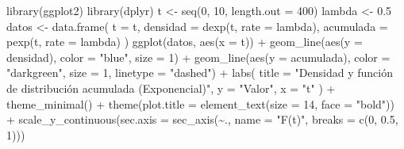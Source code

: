 \documentclass[
  letterpaper,
  ignorenonframetext,
  DIV=11,
  numbers=noendperiod]{scrartcl}
\newenvironment{Shaded}{\begin{snugshade}}{\end{snugshade}}
\newcommand{\AttributeTok}[1]{\textcolor[rgb]{0.40,0.45,0.13}{#1}}
\newcommand{\DecValTok}[1]{\textcolor[rgb]{0.68,0.00,0.00}{#1}}
\newcommand{\FloatTok}[1]{\textcolor[rgb]{0.68,0.00,0.00}{#1}}
\newcommand{\FunctionTok}[1]{\textcolor[rgb]{0.28,0.35,0.67}{#1}}
\newcommand{\NormalTok}[1]{\textcolor[rgb]{0.00,0.23,0.31}{#1}}
\newcommand{\OtherTok}[1]{\textcolor[rgb]{0.00,0.23,0.31}{#1}}
\newcommand{\SpecialCharTok}[1]{\textcolor[rgb]{0.37,0.37,0.37}{#1}}
\newcommand{\StringTok}[1]{\textcolor[rgb]{0.13,0.47,0.30}{#1}}
\begin{document}
\begin{Shaded}
\begin{Highlighting}[]
\FunctionTok{library}\NormalTok{(ggplot2)}
\FunctionTok{library}\NormalTok{(dplyr)}
\NormalTok{t }\OtherTok{\textless{}{-}} \FunctionTok{seq}\NormalTok{(}\DecValTok{0}\NormalTok{, }\DecValTok{10}\NormalTok{, }\AttributeTok{length.out =} \DecValTok{400}\NormalTok{)}
\NormalTok{lambda }\OtherTok{\textless{}{-}} \FloatTok{0.5}
\NormalTok{datos }\OtherTok{\textless{}{-}} \FunctionTok{data.frame}\NormalTok{(}
  \AttributeTok{t =}\NormalTok{ t,}
  \AttributeTok{densidad =} \FunctionTok{dexp}\NormalTok{(t, }\AttributeTok{rate =}\NormalTok{ lambda),}
  \AttributeTok{acumulada =} \FunctionTok{pexp}\NormalTok{(t, }\AttributeTok{rate =}\NormalTok{ lambda)}
\NormalTok{)}
\FunctionTok{ggplot}\NormalTok{(datos, }\FunctionTok{aes}\NormalTok{(}\AttributeTok{x =}\NormalTok{ t)) }\SpecialCharTok{+}
  \FunctionTok{geom\_line}\NormalTok{(}\FunctionTok{aes}\NormalTok{(}\AttributeTok{y =}\NormalTok{ densidad), }\AttributeTok{color =} \StringTok{"blue"}\NormalTok{, }\AttributeTok{size =} \DecValTok{1}\NormalTok{) }\SpecialCharTok{+}
  \FunctionTok{geom\_line}\NormalTok{(}\FunctionTok{aes}\NormalTok{(}\AttributeTok{y =}\NormalTok{ acumulada), }\AttributeTok{color =} \StringTok{"darkgreen"}\NormalTok{, }\AttributeTok{size =} \DecValTok{1}\NormalTok{, }\AttributeTok{linetype =} \StringTok{"dashed"}\NormalTok{) }\SpecialCharTok{+}
  \FunctionTok{labs}\NormalTok{(}
    \AttributeTok{title =} \StringTok{"Densidad y función de distribución acumulada (Exponencial)"}\NormalTok{,}
    \AttributeTok{y =} \StringTok{"Valor"}\NormalTok{,}
    \AttributeTok{x =} \StringTok{"t"}
\NormalTok{  ) }\SpecialCharTok{+}
  \FunctionTok{theme\_minimal}\NormalTok{() }\SpecialCharTok{+}
  \FunctionTok{theme}\NormalTok{(}\AttributeTok{plot.title =} \FunctionTok{element\_text}\NormalTok{(}\AttributeTok{size =} \DecValTok{14}\NormalTok{, }\AttributeTok{face =} \StringTok{"bold"}\NormalTok{)) }\SpecialCharTok{+}
  \FunctionTok{scale\_y\_continuous}\NormalTok{(}\AttributeTok{sec.axis =} \FunctionTok{sec\_axis}\NormalTok{(}\SpecialCharTok{\textasciitilde{}}\NormalTok{., }\AttributeTok{name =} \StringTok{"F(t)"}\NormalTok{, }\AttributeTok{breaks =} \FunctionTok{c}\NormalTok{(}\DecValTok{0}\NormalTok{, }\FloatTok{0.5}\NormalTok{, }\DecValTok{1}\NormalTok{)))}
\end{Highlighting}
\end{Shaded}
\end{document}
